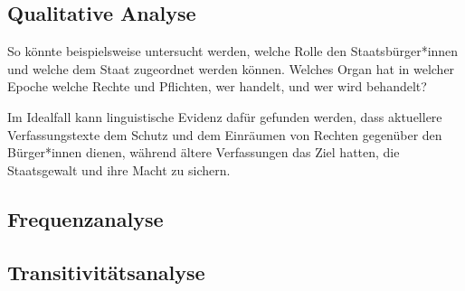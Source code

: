 \subsection{Qualitative Analyse}

So könnte beispielsweise untersucht werden, welche Rolle den Staatsbürger*innen und welche dem Staat zugeordnet werden können. Welches Organ hat in welcher Epoche welche Rechte und Pflichten, wer handelt, und wer wird behandelt?

Im Idealfall kann linguistische Evidenz dafür gefunden werden, dass aktuellere Verfassungstexte dem Schutz und dem Einräumen von Rechten gegenüber den Bürger*innen dienen, während ältere Verfassungen das Ziel hatten, die Staatsgewalt und ihre Macht zu sichern.


\subsection{Frequenzanalyse}\label{sec:3:qn}

\subsection{Transitivitätsanalyse}\label{sec:3:ql}
